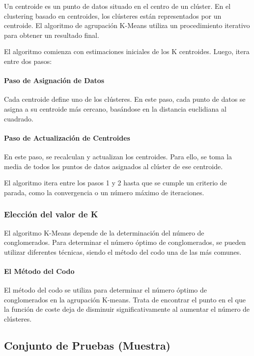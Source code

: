\documentclass[conference]{IEEEtran}
\begin{document}
Un centroide es un punto de datos situado en el centro de un clúster. En el clustering basado en centroides, los clústeres están representados por un centroide. El algoritmo de agrupación K-Means utiliza un procedimiento iterativo para obtener un resultado final.

El algoritmo comienza con estimaciones iniciales de los K centroides. Luego, itera entre dos pasos:

\paragraph{Paso de Asignación de Datos}

Cada centroide define uno de los clústeres. En este paso, cada punto de datos se asigna a su centroide más cercano, basándose en la distancia euclidiana al cuadrado.

\paragraph{Paso de Actualización de Centroides}

En este paso, se recalculan y actualizan los centroides. Para ello, se toma la media de todos los puntos de datos asignados al clúster de ese centroide.

El algoritmo itera entre los pasos 1 y 2 hasta que se cumple un criterio de parada, como la convergencia o un número máximo de iteraciones.

\subsubsection{Elección del valor de K}

El algoritmo K-Means depende de la determinación del número de conglomerados. Para determinar el número óptimo de conglomerados, se pueden utilizar diferentes técnicas, siendo el método del codo una de las más comunes.

\paragraph{El Método del Codo}

El método del codo se utiliza para determinar el número óptimo de conglomerados en la agrupación K-means. Trata de encontrar el punto en el que la función de coste deja de disminuir significativamente al aumentar el número de clústeres.

\subsection{Conjunto de Pruebas (Muestra)}
\end{document}
